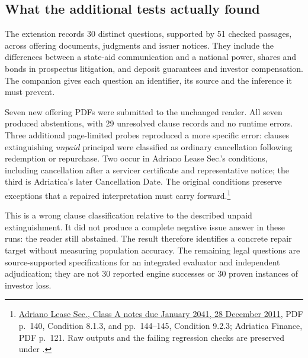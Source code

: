 \subsection{What the additional tests actually found}

The extension records 30 distinct questions, supported by 51 checked
passages, across offering documents, judgments and issuer notices.
They include the differences between a state-aid communication and a national
power, shares and bonds in prospectus litigation, and deposit guarantees
and investor compensation. The companion gives each question an identifier,
its source and the inference it must prevent.

Seven new offering PDFs were submitted to the unchanged reader. All seven
produced abstentions, with 29 unresolved clause records and no runtime
errors. Three additional page-limited probes reproduced a more specific
error: clauses extinguishing \emph{unpaid} principal were classified as
ordinary cancellation following redemption or repurchase.
Two occur in Adriano Lease Sec.'s conditions, including cancellation after
a servicer certificate and representative notice; the third is Adriatica's
later Cancellation Date. The original conditions preserve exceptions that
a repaired interpretation must carry forward.\footnote{
\href{../prospectus/corner-cases-2026-10-04/sources/jur-more-hypo-1314069/source.pdf}
{Adriano Lease Sec., Class A notes due January 2041,
28 December 2011}, PDF p.~140, Condition 8.1.3, and pp.~144--145,
Condition 9.2.3; Adriatica Finance, PDF p.~121.
Raw outputs and the failing regression checks are preserved under
.}

This is a wrong clause classification relative to the described unpaid
extinguishment. It did not produce a complete negative issue answer in
these runs: the reader still abstained. The result therefore identifies
a concrete repair target without measuring population accuracy.
The remaining legal questions are source-supported specifications for an
integrated evaluator and independent adjudication; they are not 30 reported
engine successes or 30 proven instances of investor loss.
